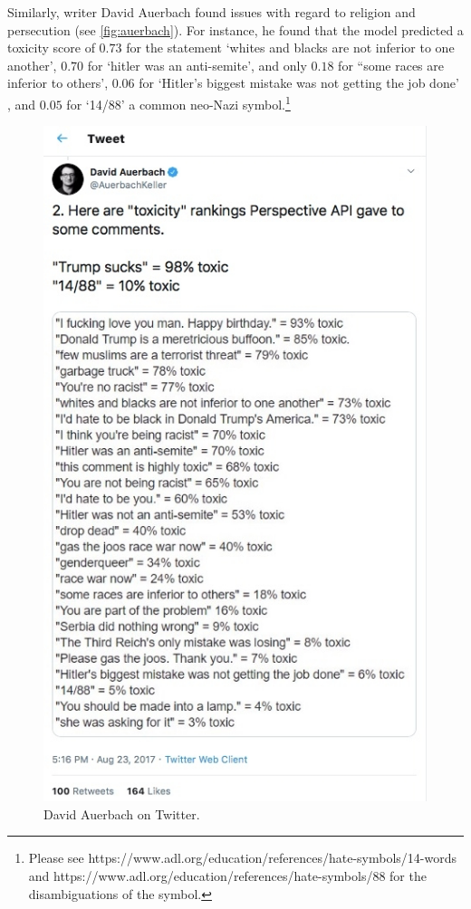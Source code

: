 Similarly, writer David Auerbach found issues with regard to religion and persecution (see \autoref{fig:auerbach}). For instance, he found that the model predicted a toxicity score of $0.73$ for the statement `whites and blacks are not inferior to one another', $0.70$ for `hitler was an anti-semite', and only $0.18$ for ``some races are inferior to others', $0.06$ for `Hitler's biggest mistake was not getting the job done' , and $0.05$ for `14/88' a common neo-Nazi symbol.\footnote{Please see https://www.adl.org/education/references/hate-symbols/14-words and https://www.adl.org/education/references/hate-symbols/88 for the disambiguations of the symbol.}

\begin{figure}[!ht]
  \centering
  \includegraphics[scale=0.5]{auerbach.png}
  \caption{David Auerbach on Twitter.}
  \label{fig:auerbach}
\end{figure}

